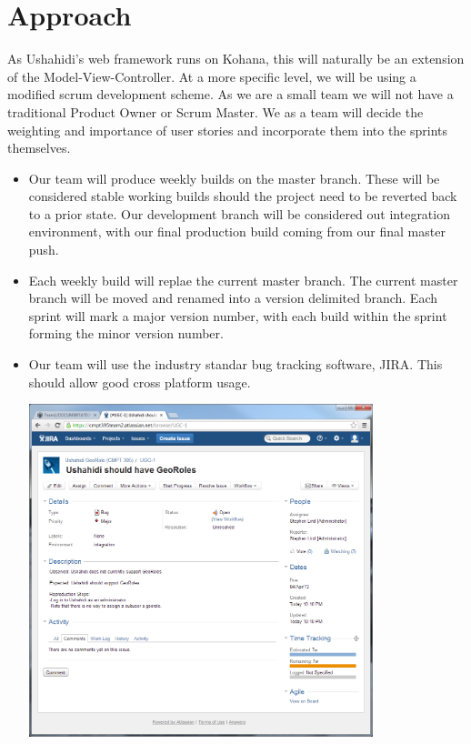 \documentclass{article}
\begin{document}
\section{Approach}
As Ushahidi's web framework runs on Kohana, this will naturally be an extension of the Model-View-Controller. At a more specific level, we will be using a modified scrum development scheme. As we are a small team we will not have a traditional Product Owner or Scrum Master. We as a team will decide the weighting and importance of user stories and incorporate them into the sprints themselves.
\begin{itemize}
  \item Our team will produce weekly builds on the master branch. These will be considered stable working builds should the project need to be reverted back to a prior state. Our development branch will be considered out integration environment, with our final production build coming from our final master push.
    \item Each weekly build will replae the current master branch. The current master branch will be moved and renamed into a version delimited branch. Each sprint will mark a major version number, with each build within the sprint forming the minor version number.
      \item Our team will use the industry standar bug tracking software, JIRA. This should allow good cross platform usage.\\
\begin{minipage}{\linewidth}
  \centering
  \includegraphics[width=100mm]{JIRAbug.png}
\end{minipage}
\end{itemize}
        
\end{document}
